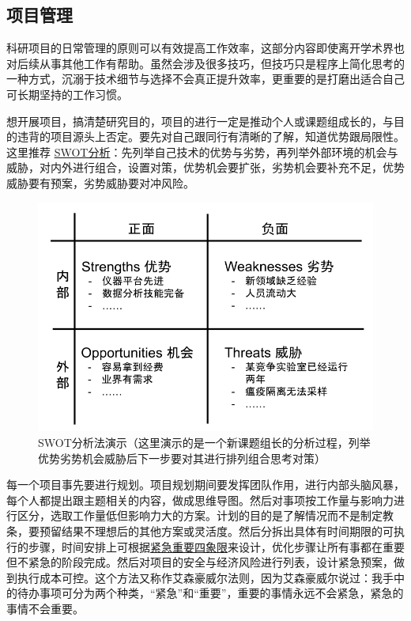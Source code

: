 \documentclass[]{tufte-book}
\begin{document}
\hypertarget{ux9879ux76eeux7ba1ux7406}{%
\subsection{项目管理}\label{ux9879ux76eeux7ba1ux7406}}

科研项目的日常管理的原则可以有效提高工作效率，这部分内容即使离开学术界也对后续从事其他工作有帮助。虽然会涉及很多技巧，但技巧只是程序上简化思考的一种方式，沉溺于技术细节与选择不会真正提升效率，更重要的是打磨出适合自己可长期坚持的工作习惯。

想开展项目，搞清楚研究目的，项目的进行一定是推动个人或课题组成长的，与目的违背的项目源头上否定。要先对自己跟同行有清晰的了解，知道优势跟局限性。这里推荐 \href{https://zh.wikipedia.org/wiki/\%E5\%BC\%B7\%E5\%BC\%B1\%E5\%8D\%B1\%E6\%A9\%9F\%E5\%88\%86\%E6\%9E\%90}{SWOT分析}：先列举自己技术的优势与劣势，再列举外部环境的机会与威胁，对内外进行组合，设置对策，优势机会要扩张，劣势机会要补充不足，优势威胁要有预案，劣势威胁要对冲风险。

\begin{figure}
\includegraphics{data/SWOT} \caption[SWOT分析法演示（这里演示的是一个新课题组长的分析过程，列举优势劣势机会威胁后下一步要对其进行排列组合思考对策）]{SWOT分析法演示（这里演示的是一个新课题组长的分析过程，列举优势劣势机会威胁后下一步要对其进行排列组合思考对策）}\label{fig:unnamed-chunk-41}
\end{figure}

每一个项目事先要进行规划。项目规划期间要发挥团队作用，进行内部头脑风暴，每个人都提出跟主题相关的内容，做成思维导图。然后对事项按工作量与影响力进行区分，选取工作量低但影响力大的方案。计划的目的是了解情况而不是制定教条，要预留结果不理想后的其他方案或灵活度。然后分拆出具体有时间期限的可执行的步骤，时间安排上可根据\href{https://wiki.mbalib.com/wiki/\%E6\%97\%B6\%E9\%97\%B4\%E2\%80\%9C\%E5\%9B\%9B\%E8\%B1\%A1\%E9\%99\%90\%E2\%80\%9D\%E6\%B3\%95}{紧急重要四象限}来设计，优化步骤让所有事都在重要但不紧急的阶段完成。然后对项目的安全与经济风险进行列表，设计紧急预案，做到执行成本可控。这个方法又称作艾森豪威尔法则，因为艾森豪威尔说过：我手中的待办事项可分为两个种类，``紧急''和``重要''，重要的事情永远不会紧急，紧急的事情不会重要。
\end{document}
